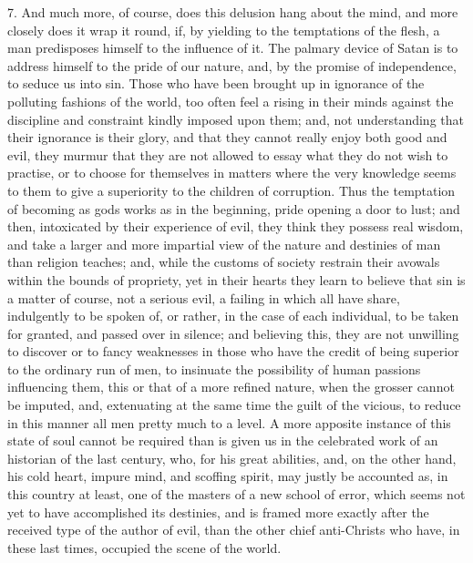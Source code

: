 7. And much more, of course, does this delusion hang about the
mind, and more closely does it wrap it round, if, by yielding to the
temptations of the flesh, a man predisposes himself to the influence
of it. The palmary device of Satan is to address himself to the pride
of our nature, and, by the promise of independence, to seduce us into
sin. Those who have been brought up in ignorance of the polluting
fashions of the world, too often feel a rising in their minds against
the discipline and constraint kindly imposed upon them; and, not
understanding that their ignorance is their glory, and that they
cannot really enjoy both good and evil, they murmur that they are not
allowed to essay what they do not wish to practise, or to choose for
themselves in matters where the very knowledge seems to them to give a
superiority to the children of corruption. Thus the temptation of
becoming as gods works as in the beginning, pride opening a door to
lust; and then, intoxicated by their experience of evil, they think
they possess real wisdom, and take a larger and more impartial view of
the nature and destinies of man than religion teaches; and, while the
customs of society restrain their avowals within the bounds of
propriety, yet in their hearts they learn to believe that sin is a
matter of course, not a serious evil, a failing in which all have
share, indulgently to be spoken of, or rather, in the case of each
individual, to be taken for granted, and passed over in silence; and
believing this, they are not unwilling to discover or to fancy
weaknesses in those who have the credit of being superior to the
ordinary run of men, to insinuate the possibility of human passions
influencing them, this or that of a more refined nature, when the
grosser cannot be imputed, and, extenuating at the same time the guilt
of the vicious, to reduce in this manner all men pretty much to a
level. A more apposite instance of this state of soul cannot be
required than is given us in the celebrated work of an historian of
the last century, who, for his great abilities, and, on the other
hand, his cold heart, impure mind, and scoffing spirit, may justly be
accounted as, in this country at least, one of the masters of a new
school of error, which seems not yet to have accomplished its
destinies, and is framed more exactly after the received type of the
author of evil, than the other chief anti-Christs who have, in these
last times, occupied the scene of the world.


